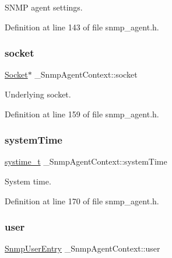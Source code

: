 S\+N\+MP agent settings. 



Definition at line 143 of file snmp\+\_\+agent.\+h.

\mbox{\label{struct__SnmpAgentContext_a969aed21c4b0366b637165bc2a52bcbf}} 
\subsubsection{\texorpdfstring{socket}{socket}}
{\footnotesize\ttfamily \hyperlink{socket_8h_aa85acfb0fa336ef495e6ba87fb88fc48}{Socket}$\ast$ \+\_\+\+Snmp\+Agent\+Context\+::socket}



Underlying socket. 



Definition at line 159 of file snmp\+\_\+agent.\+h.

\mbox{\label{struct__SnmpAgentContext_adbf0654519314a1967b5134833edd25d}} 
\subsubsection{\texorpdfstring{system\+Time}{systemTime}}
{\footnotesize\ttfamily \hyperlink{compiler__port_8h_ae3e32a98d431a02106616da3071832dd}{systime\+\_\+t} \+\_\+\+Snmp\+Agent\+Context\+::system\+Time}



System time. 



Definition at line 170 of file snmp\+\_\+agent.\+h.

\mbox{\label{struct__SnmpAgentContext_ab31287db95db12b2bb010d2c0d33558f}} 
\subsubsection{\texorpdfstring{user}{user}}
{\footnotesize\ttfamily \hyperlink{structSnmpUserEntry}{Snmp\+User\+Entry} \+\_\+\+Snmp\+Agent\+Context\+::user}



